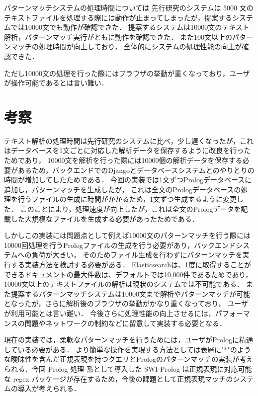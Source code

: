 \documentclass{FITpaper}
\begin{document}
  パターンマッチシステムの処理時間については
  先行研究のシステムは
  5000 文のテキストファイルを処理する際には動作が止まってしまったが，提案するシステムでは10000文でも動作が確認できた．
  提案するシステムは10000文のテキスト解析，パターンマッチ実行がともに動作を確認できた．
  また100文以上のパターンマッチの処理時間が向上しており，
  全体的にシステムの処理性能の向上が確認できた．
  
  ただし10000文の処理を行った際にはブラウザの挙動が重くなっており，ユーザが操作可能であるとは言い難い．
  
\section{考察}
  テキスト解析の処理時間は先行研究のシステムに比べ，少し遅くなったが，これはデータベースを1文ごとに対応した解析データを保存するように改良を行ったためであり，
  10000文を解析を行った際には10000個の解析データを保存する必要があるため，バックエンドでのDjangoとデータベースシステムとのやりとりの時間が増加してしたためである．
  今回の実装では1文ずつPrologデータベースに追加し，パターンマッチを生成したが，
  これは全文のPrologデータベースの処理を行うファイルの生成に時間がかかるため，1文ずつ生成するように変更した．
  このことにより，処理速度が向上したが，これは全文のPrologデータを記載した大規模なファイルを生成する必要があったためである．

  しかしこの実装には問題点として例えば10000文のパターンマッチを行う際には10000回処理を行うPrologファイルの生成を行う必要があり，バックエンドシステムへの負荷が大きい，
  そのためファイル生成を行わずにパターンマッチを実行する実装方法を検討する必要がある．
  Elasticsearchは、1度に取得することができるドキュメントの最大件数は、デフォルトでは10,000件であるためであり，
  10000文以上のテキストファイルの解析は現状のシステムでは不可能である．
  また提案するパターンマッチシステムは10000文まで解析やパターンマッチが可能となったが，さらに解析後のブラウザの挙動がかなり重くなっており，
  ユーザが利用可能とは言い難い．
  今後さらに処理性能の向上させるには，パフォーマンスの問題やネットワークの制約などに留意して実装する必要となる．
  

  現在の実装では，柔軟なパターンマッチを行うためには，ユーザがPrologに精通している必要がある．
  より簡単な操作を実現する方法としては表層に"*"のような曖昧性を含んだ正規表現を持つクエリとPrologのパターンマッチの実装が考えられる．今回 Prolog 処理
系として導入した SWI-Prolog は正規表現に対応可能な regex パッケージが存在するため，今後の課題として正規表現マッチのシステムの導入が考えられる．
\end{document}
